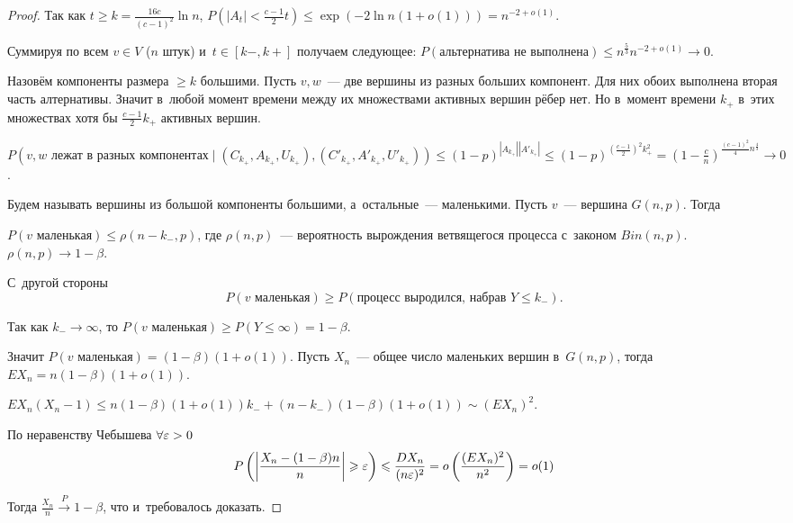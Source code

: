 \documentclass{article}
\begin{document}
\begin{proof}
	Так как $t \ge k = \frac{16c}{(c-1)^2} \ln n$, $P(|A_t| < \frac{c-1}{2}t) \le \exp(-2\ln n(1 +
	o(1))) = n^{-2 + o(1)}$.

	Суммируя по всем $v \in V$ ($n$ штук) и~$t \in [k-, k+]$ получаем следующее: $P(\text{альтернатива не
	выполнена}) \le n^\frac{5}{3} n^{-2+o(1)} \rightarrow 0$.

	Назовём компоненты размера $\ge k$ большими. Пусть $v, w$~--- две вершины из разных больших
	компонент. Для них обоих выполнена вторая часть алтернативы. Значит в~любой момент времени между
	их множествами активных вершин рёбер нет. Но в~момент времени $k_+$ в~этих множествах хотя бы
	$\frac{c-1}{2}k_+$ активных вершин.

	$P(v, w \text{ лежат в~разных компонентах} \mid (C_{k_+},
	A_{k_+}, U_{k_+}), (C'_{k_+}, A'_{k_+}, U'_{k_+})) \le (1 - p)^{|A_{k_+}||A'_{k_+}|} \le (1 -
	p)^{\left( \frac{c-1}{2}\right)^2 k_+^2} = \left(1 - \frac{c}{n}\right)^{\frac{(c-1)^2}{4}
	n^\frac{4}{3}} \rightarrow 0$.

	Будем называть вершины из большой компоненты большими, а~остальные~--- маленькими. Пусть $v$~---
	вершина $G(n, p)$. Тогда

	$P(v \text{ маленькая}) \le \rho(n - k_-, p)$, где $\rho(n, p)$~--- вероятность вырождения
	ветвящегося процесса с~законом $Bin(n, p)$. $\rho(n, p) \rightarrow 1 - \beta$.

	С~другой стороны $$P(v \text{ маленькая}) \ge P(\text{процесс выродился, набрав } Y \le k_-).$$

	Так как $k_- \rightarrow \infty$, то $P(v \text{ маленькая}) \ge P(Y \le \infty) = 1 -
	\beta$.

	Значит $P(v \text{ маленькая}) = (1 - \beta)(1 + o(1))$. Пусть $X_n$~--- общее число маленьких
	вершин в~$G(n, p)$, тогда $EX_n = n(1 - \beta)(1 + o(1))$.

	$EX_n(X_n-1) \le n(1 - \beta)(1 + o(1))k_- + (n-k_-)(1 - \beta)(1 + o(1)) \sim (EX_n)^2$.

	По неравенству Чебышева $\forall \varepsilon > 0$
	$$ P\left(\left|\frac{X_n - (1 - \beta)n}{n} \right| \geqslant \varepsilon \right) \leqslant \frac{DX_n}{(n\varepsilon)^2} =
	o\left(\frac{(EX_n)^2}{n^2}\right) = o(1)$$

	Тогда $\frac{X_n}{n} \overset{P}\rightarrow 1 - \beta$, что и~требовалось доказать.
\end{proof}
\end{document}

